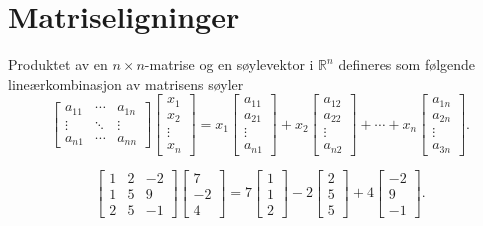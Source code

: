 \section*{Matriseligninger}
Produktet av en $n\times n$-matrise og en søylevektor i $\mathbb{R}^n$ defineres som følgende lineærkombinasjon av matrisens søyler
\begin{equation*}
\begin{bmatrix}
a_{11}    &  \cdots & a_{1n}   \\
\vdots  & \ddots & \vdots\\
a_{n1}  & \cdots &  a_{nn}  
\end{bmatrix}
\begin{bmatrix}
x_1   \\
x_2 \\
\vdots \\
x_n 
\end{bmatrix}=
x_1
\begin{bmatrix}
a_{11}     \\
a_{21}   \\
\vdots \\
a_{n1}   
\end{bmatrix}
+
x_2
\begin{bmatrix}
a_{12}    \\
a_{22}    \\
\vdots \\
a_{n2}    
\end{bmatrix}
+
\cdots
+
x_n
\begin{bmatrix}
a_{1n}   \\
a_{2n}  \\
\vdots \\
a_{3n}  
\end{bmatrix}.
\end{equation*}
\begin{ex}
	\begin{equation*}
	\begin{bmatrix}
	1  &  2  &  -2   \\
	1  & 5  &  9  \\
	2  & 5  &  -1  
	\end{bmatrix}
	\begin{bmatrix}
	7   \\
	-2 \\
	4 
	\end{bmatrix}=
	7
	\begin{bmatrix}
	1     \\
	1   \\
	2   
	\end{bmatrix}
	-
	2
	\begin{bmatrix}
	2   \\
	5   \\
	5    
	\end{bmatrix}
	+
	4
	\begin{bmatrix}
	-2   \\
	9 \\
	-1 
	\end{bmatrix}.
	\end{equation*}
\end{ex}
